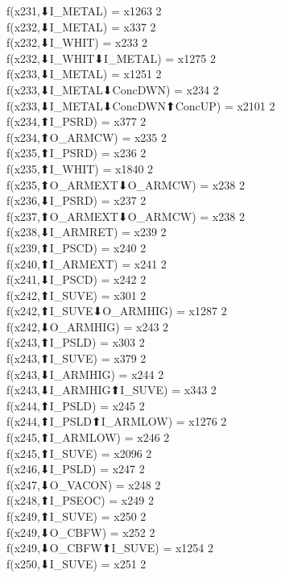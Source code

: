 f(x231,⬇I_METAL) = x1263 {2} \\
f(x232,⬇I_METAL) = x337 {2} \\
f(x232,⬇I_WHIT) = x233 {2} \\
f(x232,⬇I_WHIT⬇I_METAL) = x1275 {2} \\
f(x233,⬇I_METAL) = x1251 {2} \\
f(x233,⬇I_METAL⬇ConcDWN) = x234 {2} \\
f(x233,⬇I_METAL⬇ConcDWN⬆ConcUP) = x2101 {2} \\
f(x234,⬆I_PSRD) = x377 {2} \\
f(x234,⬆O_ARMCW) = x235 {2} \\
f(x235,⬆I_PSRD) = x236 {2} \\
f(x235,⬆I_WHIT) = x1840 {2} \\
f(x235,⬆O_ARMEXT⬇O_ARMCW) = x238 {2} \\
f(x236,⬇I_PSRD) = x237 {2} \\
f(x237,⬆O_ARMEXT⬇O_ARMCW) = x238 {2} \\
f(x238,⬇I_ARMRET) = x239 {2} \\
f(x239,⬆I_PSCD) = x240 {2} \\
f(x240,⬆I_ARMEXT) = x241 {2} \\
f(x241,⬇I_PSCD) = x242 {2} \\
f(x242,⬆I_SUVE) = x301 {2} \\
f(x242,⬆I_SUVE⬇O_ARMHIG) = x1287 {2} \\
f(x242,⬇O_ARMHIG) = x243 {2} \\
f(x243,⬆I_PSLD) = x303 {2} \\
f(x243,⬆I_SUVE) = x379 {2} \\
f(x243,⬇I_ARMHIG) = x244 {2} \\
f(x243,⬇I_ARMHIG⬆I_SUVE) = x343 {2} \\
f(x244,⬆I_PSLD) = x245 {2} \\
f(x244,⬆I_PSLD⬆I_ARMLOW) = x1276 {2} \\
f(x245,⬆I_ARMLOW) = x246 {2} \\
f(x245,⬆I_SUVE) = x2096 {2} \\
f(x246,⬇I_PSLD) = x247 {2} \\
f(x247,⬇O_VACON) = x248 {2} \\
f(x248,⬆I_PSEOC) = x249 {2} \\
f(x249,⬆I_SUVE) = x250 {2} \\
f(x249,⬇O_CBFW) = x252 {2} \\
f(x249,⬇O_CBFW⬆I_SUVE) = x1254 {2} \\
f(x250,⬇I_SUVE) = x251 {2} \\
